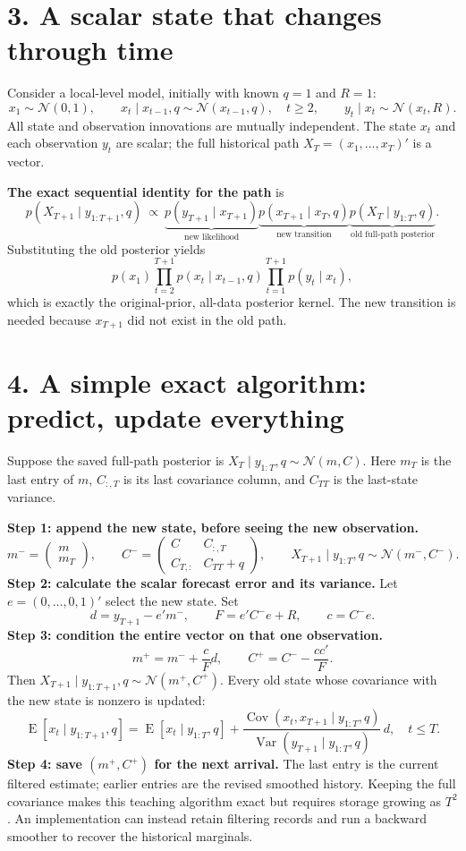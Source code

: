 \documentclass[10pt,a4paper]{article}
\newcommand{\Normal}{\mathcal N}
\newcommand{\Var}{\operatorname{Var}}
\newcommand{\Cov}{\operatorname{Cov}}
\newcommand{\E}{\operatorname E}
\begin{document}
\clearpage
\section*{3. A scalar state that changes through time}
Consider a local-level model, initially with known $q=1$ and $R=1$:
\[
x_1\sim\Normal(0,1),\qquad
x_t\mid x_{t-1},q\sim\Normal(x_{t-1},q),\quad t\geq2,
\qquad y_t\mid x_t\sim\Normal(x_t,R).
\]
All state and observation innovations are mutually independent. The state $x_t$ and each
observation $y_t$ are scalar; the full historical path $X_T=(x_1,\ldots,x_T)'$ is a vector.

\textbf{The exact sequential identity for the path} is
\[
\boxed{
p(X_{T+1}\mid y_{1:T+1},q)
\ \propto\
\underbrace{p(y_{T+1}\mid x_{T+1})}_{\text{new likelihood}}
\underbrace{p(x_{T+1}\mid x_T,q)}_{\text{new transition}}
\underbrace{p(X_T\mid y_{1:T},q)}_{\text{old full-path posterior}}.
}
\]
Substituting the old posterior yields
\[
p(x_1)\prod_{t=2}^{T+1}p(x_t\mid x_{t-1},q)
\prod_{t=1}^{T+1}p(y_t\mid x_t),
\]
which is exactly the original-prior, all-data posterior kernel. The new transition is
needed because $x_{T+1}$ did not exist in the old path.

\section*{4. A simple exact algorithm: predict, update everything}
Suppose the saved full-path posterior is $X_T\mid y_{1:T},q\sim\Normal(m,C)$.
Here $m_T$ is the last entry of $m$, $C_{:,T}$ is its last covariance column,
and $C_{TT}$ is the last-state variance.

\textbf{Step 1: append the new state, before seeing the new observation.}
\[
m^- = \begin{pmatrix}m\\m_T\end{pmatrix},\qquad
C^- = \begin{pmatrix}C&C_{:,T}\\C_{T,:}&C_{TT}+q\end{pmatrix},\qquad
X_{T+1}\mid y_{1:T},q\sim\Normal(m^-,C^-).
\]
\textbf{Step 2: calculate the scalar forecast error and its variance.}
Let $e=(0,\ldots,0,1)'$ select the new state. Set
\[
d=y_{T+1}-e'm^-,\qquad F=e'C^-e+R,\qquad c=C^-e.
\]
\textbf{Step 3: condition the entire vector on that one observation.}
\[
\boxed{m^+=m^-+\frac{c}{F}d,\qquad C^+=C^--\frac{cc'}F.}
\]
Then $X_{T+1}\mid y_{1:T+1},q\sim\Normal(m^+,C^+)$.
Every old state whose covariance with the new state is nonzero is updated:
\[
\E[x_t\mid y_{1:T+1},q]
=\E[x_t\mid y_{1:T},q]
+\frac{\Cov(x_t,x_{T+1}\mid y_{1:T},q)}{\Var(y_{T+1}\mid y_{1:T},q)}\,d,
\quad t\leq T.
\]
\textbf{Step 4: save $(m^+,C^+)$ for the next arrival.}
The last entry is the current filtered estimate; earlier entries are the revised smoothed
history. Keeping the full covariance makes this teaching algorithm exact but requires
storage growing as $T^2$. An implementation can instead retain filtering records and run
a backward smoother to recover the historical marginals.
\end{document}
